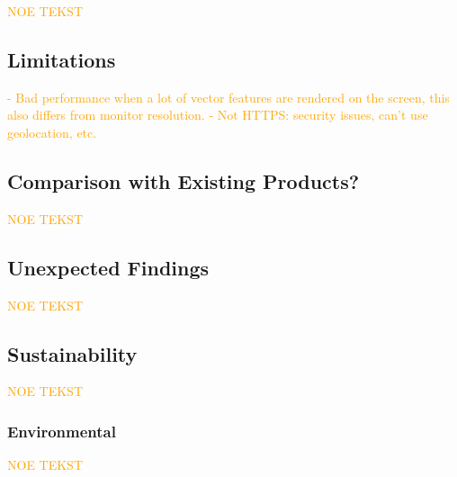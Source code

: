 \textcolor{orange}{NOE TEKST}

\subsection{Limitations}


\textcolor{orange}{- Bad performance when a lot of vector features are rendered on the screen, this also differs from monitor resolution. - Not HTTPS: security issues, can't use geolocation, etc.}

\subsection{Comparison with Existing Products?} 

\textcolor{orange}{NOE TEKST}

\subsection{Unexpected Findings} %

\textcolor{orange}{NOE TEKST}

\subsection{Sustainability} %

\textcolor{orange}{NOE TEKST}

\subsubsection*{Environmental}

\textcolor{orange}{NOE TEKST}
\begin{comment}
LENKE FRA PETER: https://www.ntnu.edu/web/excited/sustainability-in-computing-education
- mer lukkede hogstformer og mindre bruk av flatehogst 
- **lavere drivstofforbruk og smartere kjøring med skogsmaskin** 
    - **lavere førerbelastning**
    - **mindre terrengslitasje**
    - **høyere produktivitet**
- produsere tømmer som er mest mulig tilpasset industriens behov 
- **videreutvikle teknologi for driftsoppfølging og førerstøtte for maskinførerne** 

###########################
FNs Bærekraftsmål som virker relevante (KANSKJE SAMMENLIGN MED HVA NORGE GJØR I DAG?):
- 9
- 12 (?) VIRKER SOM DEN FOKUSERER MEST PÅ UTVIKLINGSLAND?
- 15 (?)
\end{comment}

